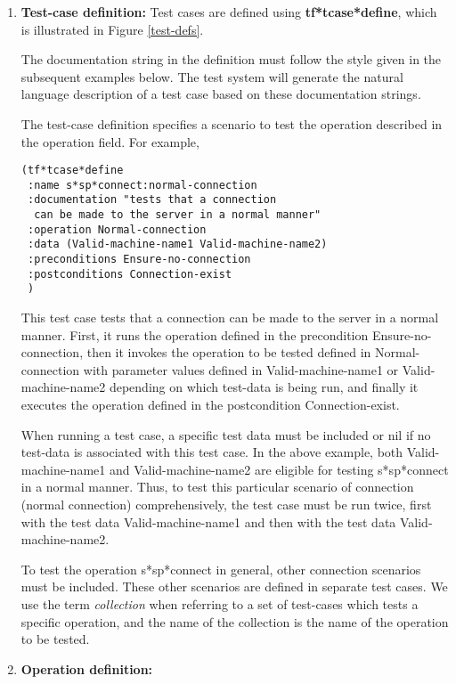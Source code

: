 \begin {enumerate}
\item {\bf Test-case definition:}
Test cases are defined using {\bf tf*tcase*define}, which is 
illustrated in Figure \ref{test-defs}.

The documentation string in the definition must follow the style given
in the subsequent examples below.  The test system will generate the
natural language description of a test case based on these
documentation strings.

The test-case definition specifies a scenario to test the operation
described in the operation field.  For example, 

\small\begin{verbatim}
(tf*tcase*define
 :name s*sp*connect:normal-connection
 :documentation "tests that a connection 
  can be made to the server in a normal manner"
 :operation Normal-connection
 :data (Valid-machine-name1 Valid-machine-name2)
 :preconditions Ensure-no-connection
 :postconditions Connection-exist
 )
\end{verbatim}\normalsize

This test case tests that a connection can be made to the server in a
normal manner.  First, it runs the operation defined in the
precondition Ensure-no-connection, then it invokes the operation to be
tested defined in Normal-connection with parameter values defined in
Valid-machine-name1 or Valid-machine-name2 depending on which
test-data is being run, and finally it executes the operation defined
in the postcondition Connection-exist.

When running a test case, a specific test data must be included or nil
if no test-data is associated with this test case. In the above
example, both Valid-machine-name1 and Valid-machine-name2 are eligible
for testing s*sp*connect in a normal manner.  Thus, to test this
particular scenario of connection (normal connection) comprehensively,
the test case must be run twice, first with the test data
Valid-machine-name1 and then with the test data Valid-machine-name2.

To test the operation s*sp*connect in general, other connection
scenarios must be included.  These other scenarios are defined in
separate test cases. We use the term {\it collection} when referring
to a set of test-cases which tests a specific operation, and the name
of the collection is the name of the operation to be tested.


\item {\bf Operation definition:}
  

\end{enumerate}

